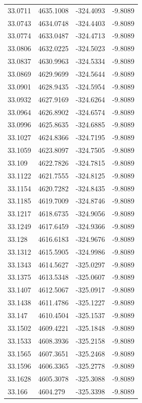 \begin{table}[H]
\begin{tabular}{llll}
33.0711 & 4635.1008 & -324.4093 & -9.8089 \\
33.0743 & 4634.0748 & -324.4403 & -9.8089 \\
33.0774 & 4633.0487 & -324.4713 & -9.8089 \\
33.0806 & 4632.0225 & -324.5023 & -9.8089 \\
33.0837 & 4630.9963 & -324.5334 & -9.8089 \\
33.0869 & 4629.9699 & -324.5644 & -9.8089 \\
33.0901 & 4628.9435 & -324.5954 & -9.8089 \\
33.0932 & 4627.9169 & -324.6264 & -9.8089 \\
33.0964 & 4626.8902 & -324.6574 & -9.8089 \\
33.0996 & 4625.8635 & -324.6885 & -9.8089 \\
33.1027 & 4624.8366 & -324.7195 & -9.8089 \\
33.1059 & 4623.8097 & -324.7505 & -9.8089 \\
33.109 & 4622.7826 & -324.7815 & -9.8089 \\
33.1122 & 4621.7555 & -324.8125 & -9.8089 \\
33.1154 & 4620.7282 & -324.8435 & -9.8089 \\
33.1185 & 4619.7009 & -324.8746 & -9.8089 \\
33.1217 & 4618.6735 & -324.9056 & -9.8089 \\
33.1249 & 4617.6459 & -324.9366 & -9.8089 \\
33.128 & 4616.6183 & -324.9676 & -9.8089 \\
33.1312 & 4615.5905 & -324.9986 & -9.8089 \\
33.1343 & 4614.5627 & -325.0297 & -9.8089 \\
33.1375 & 4613.5348 & -325.0607 & -9.8089 \\
33.1407 & 4612.5067 & -325.0917 & -9.8089 \\
33.1438 & 4611.4786 & -325.1227 & -9.8089 \\
33.147 & 4610.4504 & -325.1537 & -9.8089 \\
33.1502 & 4609.4221 & -325.1848 & -9.8089 \\
33.1533 & 4608.3936 & -325.2158 & -9.8089 \\
33.1565 & 4607.3651 & -325.2468 & -9.8089 \\
33.1596 & 4606.3365 & -325.2778 & -9.8089 \\
33.1628 & 4605.3078 & -325.3088 & -9.8089 \\
33.166 & 4604.279 & -325.3398 & -9.8089 \\

\end{tabular}
\end{table}
